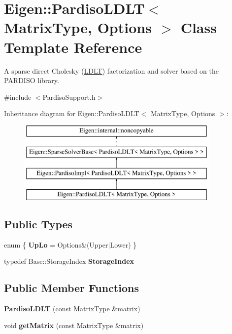 \hypertarget{class_eigen_1_1_pardiso_l_d_l_t}{}\section{Eigen\+::Pardiso\+L\+D\+LT$<$ Matrix\+Type, Options $>$ Class Template Reference}
\label{class_eigen_1_1_pardiso_l_d_l_t}


A sparse direct Cholesky (\mbox{\hyperlink{class_eigen_1_1_l_d_l_t}{L\+D\+LT}}) factorization and solver based on the P\+A\+R\+D\+I\+SO library.  




{\ttfamily \#include $<$Pardiso\+Support.\+h$>$}

Inheritance diagram for Eigen\+::Pardiso\+L\+D\+LT$<$ Matrix\+Type, Options $>$\+:\begin{figure}[H]
\begin{center}
\leavevmode
\includegraphics[height=4.000000cm]{class_eigen_1_1_pardiso_l_d_l_t}
\end{center}
\end{figure}
\subsection*{Public Types}
\begin{DoxyCompactItemize}
\item 
\mbox{\label{class_eigen_1_1_pardiso_l_d_l_t_ac883b5f1719dbf8d1e1869b49a7f301d}} 
enum \{ {\bfseries Up\+Lo} = Options\&(Upper$\vert$\+Lower)
 \}
\item 
\mbox{\label{class_eigen_1_1_pardiso_l_d_l_t_ae18a83f05749b82202c0e2fabcb7a5ef}} 
typedef Base\+::\+Storage\+Index {\bfseries Storage\+Index}
\end{DoxyCompactItemize}
\subsection*{Public Member Functions}
\begin{DoxyCompactItemize}
\item 
\mbox{\label{class_eigen_1_1_pardiso_l_d_l_t_a6305c6f32af14b1e956185ec38ae5fbe}} 
{\bfseries Pardiso\+L\+D\+LT} (const Matrix\+Type \&matrix)
\item 
\mbox{\label{class_eigen_1_1_pardiso_l_d_l_t_ac9934f8e3bf712157ca2639a5fa63f50}} 
void {\bfseries get\+Matrix} (const Matrix\+Type \&matrix)
\end{DoxyCompactItemize}
